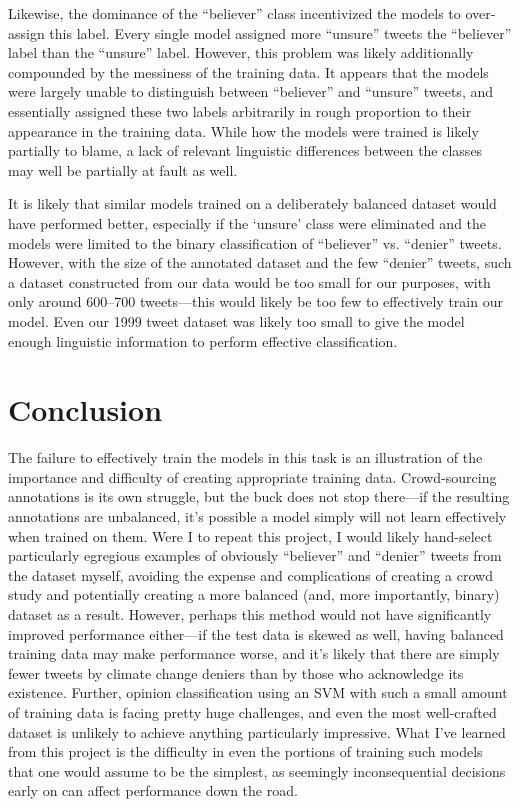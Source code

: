 \documentclass[article,oneside,a4paper,12pt]{memoir}
\begin{document}
Likewise, the dominance of the ``believer'' class incentivized the models to over-assign this label. Every single model assigned more ``unsure'' tweets the ``believer'' label than the ``unsure'' label. However, this problem was likely additionally compounded by the messiness of the training data. It appears that the models were largely unable to distinguish between ``believer'' and ``unsure'' tweets, and essentially assigned these two labels arbitrarily in rough proportion to their appearance in the training data. While how the models were trained is likely partially to blame, a lack of relevant linguistic differences between the classes may well be partially at fault as well. 

It is likely that similar models trained on a deliberately balanced dataset would have performed better, especially if the `unsure' class were eliminated and the models were limited to the binary classification of ``believer'' vs. ``denier'' tweets. However, with the size of the annotated dataset and the few ``denier'' tweets, such a dataset constructed from our data would be too small for our purposes, with only around 600--700 tweets---this would likely be too few to effectively train our model. Even our 1999 tweet dataset was likely too small to give the model enough linguistic information to perform effective classification.

\section{Conclusion}

The failure to effectively train the models in this task is an illustration of the importance and difficulty of creating appropriate training data. Crowd-sourcing annotations is its own struggle, but the buck does not stop there---if the resulting annotations are unbalanced, it's possible a model simply will not learn effectively when trained on them. Were I to repeat this project, I would likely hand-select particularly egregious examples of obviously ``believer'' and ``denier'' tweets from the dataset myself, avoiding the expense and complications of creating a crowd study and potentially creating a more balanced (and, more importantly, binary) dataset as a result. However, perhaps this method would not have significantly improved performance either---if the test data is skewed as well, having balanced training data may make performance worse, and it's likely that there are simply fewer tweets by climate change deniers than by those who acknowledge its existence. Further, opinion classification using an SVM with such a small amount of training data is facing pretty huge challenges, and even the most well-crafted dataset is unlikely to achieve anything particularly impressive. What I've learned from this project is the difficulty in even the portions of training such models that one would assume to be the simplest, as seemingly inconsequential decisions early on can affect performance down the road.

\printbibliography
\end{document}
